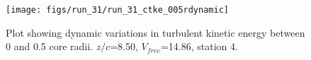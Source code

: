\begin{figure}[H]
\centering
\texttt{[image: figs/run\_31/run\_31\_ctke\_005rdynamic]}
\caption{Plot showing dynamic variations in turbulent kinetic energy between 0 and 0.5 core radii. $z/c$=8.50, $V_{free}$=14.86, station 4.}
\label{fig:run_31_ctke_005rdynamic}
\end{figure}


